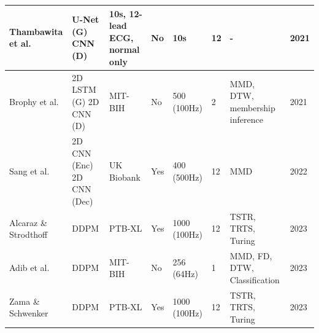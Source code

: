 \begin{table}[ht]
\begin{tabular}{|p{1.5cm}|p{2.3cm}|p{1.8cm}|p{1cm}|p{1.8cm}|p{1cm}|p{1.8cm}|p{0.7cm}|}
\hline
Thambawita et al. \cite{thambawitaDeepFakeElectrocardiogramsUsing2021} & U-Net (G) CNN (D) & 10s, 12-lead ECG, normal only & No & 10s & 12 & - & 2021 \\
\hline
Brophy et al. \cite{brophyMultivariateGenerativeAdversarial2021} & 2D LSTM (G) 2D CNN (D) & MIT-BIH & No & 500 (100Hz) & 2 & MMD, DTW, membership inference & 2021 \\
\hline
Sang et al. \cite{sangGeneration12LeadElectrocardiogram2022} & 2D CNN (Enc) 2D CNN (Dec) & UK Biobank & Yes & 400 (500Hz) & 12 & MMD & 2022 \\
\hline
Alcaraz \& Strodthoff \cite{alcarazDiffusionbasedConditionalECG2023} & DDPM \cite{nicholImprovedDenoisingDiffusion2021} & PTB-XL & Yes & 1000 (100Hz) & 12 & TSTR, TRTS, Turing & 2023 \\
\hline
Adib et al. \cite{adibSyntheticECGSignal2022} & DDPM \cite{nicholImprovedDenoisingDiffusion2021} & MIT-BIH & No & 256 (64Hz) & 1 & MMD, FD, DTW, Classification & 2023 \\
\hline
Zama \& Schwenker \cite{zama_ecg_2023} & DDPM \cite{nicholImprovedDenoisingDiffusion2021} & PTB-XL & Yes & 1000 (100Hz) & 12 & TSTR, TRTS, Turing & 2023 \\
\hline
\end{tabular}
\end{table}




